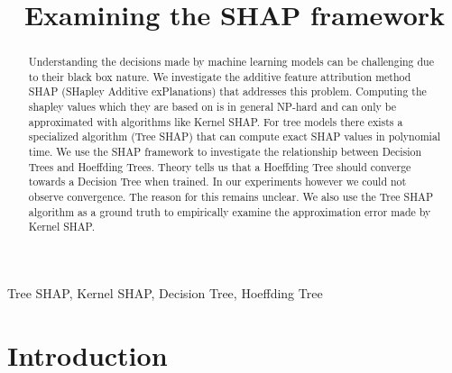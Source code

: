 \documentclass[conference]{IEEEtran}
\begin{document}
\title{Examining the SHAP framework}

\author{
}

\maketitle

\begin{abstract}
Understanding the decisions made by machine learning models can be challenging due to their black box nature.
We investigate the additive feature attribution method SHAP (SHapley Additive exPlanations) that addresses this problem. 
Computing the shapley values which they are based on is in general NP-hard and can only be approximated with algorithms like Kernel SHAP.
For tree models there exists a specialized algorithm (Tree SHAP) that can compute exact SHAP values in polynomial time. 
We use the SHAP framework to investigate the relationship between Decision Trees and Hoeffding Trees. 
Theory tells us that a Hoeffding Tree should converge towards a Decision Tree when trained. 
In our experiments however we could not observe convergence. 
The reason for this remains unclear.
We also use the Tree SHAP algorithm as a ground truth to empirically examine the approximation error made by Kernel SHAP.
\end{abstract}

\begin{IEEEkeywords}
Tree SHAP, Kernel SHAP, Decision Tree, Hoeffding Tree
\end{IEEEkeywords}

\section{Introduction}
\end{document}
